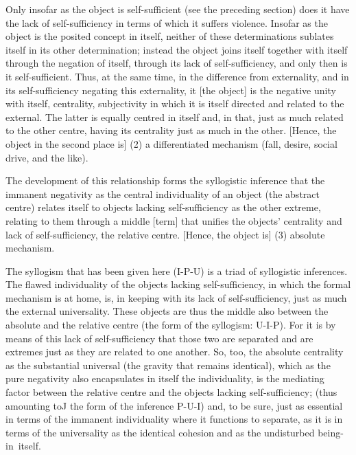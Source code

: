 Only insofar as the object is self-sufficient
(see the preceding section)
does it have the lack of self-sufficiency
in terms of which it suffers violence.
Insofar as the object is the posited concept in itself,
neither of these determinations sublates itself
in its other determination;
instead the object joins itself together with itself
through the negation of itself,
through its lack of self-sufficiency,
and only then is it self-sufficient.
Thus, at the same time, in the difference from externality,
and in its self-sufficiency negating this externality,
it [the object] is the negative unity with itself, centrality,
subjectivity in which it is itself directed and related to the external.
The latter is equally centred in itself
and, in that, just as much related
to the other centre,
having its centrality just as much in the other.
[Hence, the object in the second place is]
(2) a differentiated mechanism
(fall, desire, social drive, and the like).

The development of this relationship
forms the syllogistic inference
that the immanent negativity
as the central individuality of an object (the abstract centre)
relates itself to objects lacking self-sufficiency
as the other extreme,
relating to them through a middle [term]
that unifies the objects' centrality
and lack of self-sufficiency,
the relative centre.
[Hence, the object is]
(3) absolute mechanism.

The syllogism that has been given here (I-P-U)
is a triad of syllogistic inferences.
The flawed individuality of the objects lacking self-sufficiency,
in which the formal mechanism is at home, is,
in keeping with its lack of self-sufficiency,
just as much the external universality.
These objects are thus the middle also
between the absolute and the relative centre
(the form of the syllogism: U-I-P).
For it is by means of this lack of self-sufficiency
that those two are separated and are extremes
just as they are related to one another.
So, too, the absolute centrality as the substantial universal
(the gravity that remains identical),
which as the pure negativity
also encapsulates in itself the individuality,
is the mediating factor between the relative centre
and the objects lacking self-sufficiency;
(thus amounting toJ the form of the inference P-U-I)
and, to be sure, just as essential
in terms of the immanent individuality
where it functions to separate,
as it is in terms of the universality
as the identical cohesion and
as the undisturbed being-in~itself.


